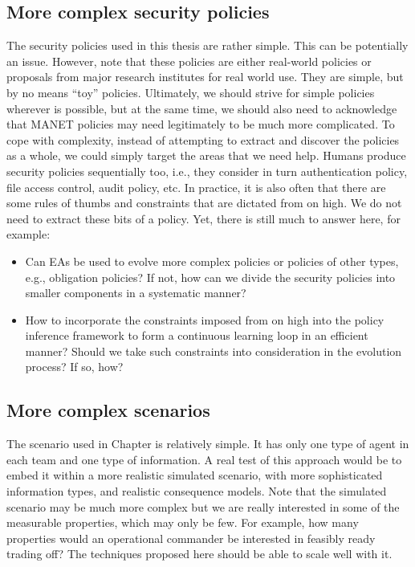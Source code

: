 \subsection{More complex security policies}
The security policies used in this thesis are rather simple. This can
be potentially an issue. However, note that these policies are either
real-world policies or proposals from major research institutes for
real world use. They are simple, but by no means ``toy''
policies. Ultimately, we should strive for simple policies wherever is
possible, but at the same time, we should also need to acknowledge
that MANET policies may need legitimately to be much more
complicated. To cope with complexity, instead of attempting to extract
and discover the policies as a whole, we could simply target the areas
that we need help. Humans produce security policies sequentially too,
i.e., they consider in turn authentication policy, file access
control, audit policy, etc. In practice, it is also often that there
are some rules of thumbs and constraints that are dictated from on
high. We do not need to extract these bits of a policy. Yet, there is
still much to answer here, for example:
\begin{itemize}
\item Can EAs be used to evolve more complex policies or policies of
  other types, e.g., obligation policies? If not, how can we divide
  the security policies into smaller components in a systematic
  manner?
\item How to incorporate the constraints imposed from on high into
  the policy inference framework to form a continuous learning loop
  in an efficient manner? Should we take such constraints into
  consideration in the evolution process? If so, how?
\end{itemize}

\subsection{More complex scenarios}
The scenario used in Chapter is
relatively simple. It has only one type of agent in each team and one
type of information. A real test of this approach would be to embed it
within a more realistic simulated scenario, with more sophisticated
information types, and realistic consequence models. Note that the
simulated scenario may be much more complex but we are really
interested in some of the measurable properties, which may only be
few. For example, how many properties would an operational commander
be interested in feasibly ready trading off? The techniques proposed
here should be able to scale well with it.

